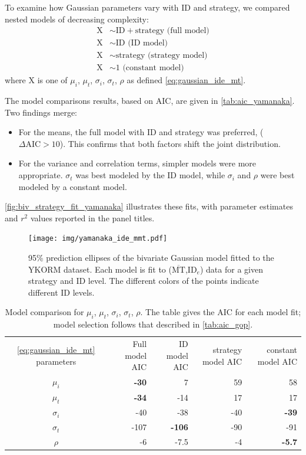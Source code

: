 \documentclass[acmlarge, manuscript,review]{acmart}
\newcommand{\mmt}{\ensuremath{\overline{\mt}}\xspace}
\newcommand{\mt}{\ensuremath{{\text{MT}}}\xspace}
\newcommand{\ide}{\ensuremath{{\text{ID}_e}}\xspace}
\begin{document}
To examine how Gaussian parameters vary with ID and strategy, we compared nested models of decreasing complexity:
\begin{align}
	\text{X} & \sim \text{ID} + \text{strategy (full model)}  \\
	\text{X} &\sim \text{ID (ID model)} \\
	\text{X} &\sim \text{strategy (strategy model)} \\
	\text{X} &\sim 1 \text{ (constant model)} 
\end{align}
where X is one of $\mu_i$, $\mu_t$, $\sigma_i$, $\sigma_t$, $\rho$ as defined \autoref{eq:gaussian_ide_mt}. 


The model comparisons results, based on AIC, are given in \autoref{tab:aic_yamanaka}. Two findings merge:
\begin{itemize}
	\item For the means, the full model with ID and strategy was preferred, ($\Delta\text{AIC} > 10$). This confirms that both factors shift the joint distribution.
	\item For the variance and correlation terms, simpler models were more appropriate. $\sigma_t$ was best modeled by the ID model, while $\sigma_i$ and $\rho$ were best modeled by a constant model.
\end{itemize}

\autoref{fig:biv_strategy_fit_yamanaka} illustrates these fits, with parameter estimates and $r^2$ values reported in the panel titles.


\begin{figure}[htbp]
	\centering
	\texttt{[image: img/yamanaka\_ide\_mmt.pdf]}
	\caption{95\% prediction ellipses of the bivariate Gaussian model fitted to the YKORM dataset. Each model is fit to (\mmt,\ide) data for a given strategy and ID level. The different colors of the points indicate different ID levels.}
	\label{fig:yamanaka_ide_mmt}
\end{figure}

\begin{table}[htbp]
	\centering
	\caption{Model comparison for $\mu_i$, $\mu_t$, $\sigma_i$, $\sigma_t$, $\rho$. The table gives the AIC for each model fit; model selection follows that described in \autoref{tab:aic_gop}.}
	\label{tab:aic_yamanaka}
	\begin{tabular}{c rrrr}
	\autoref{eq:gaussian_ide_mt} parameters	& Full model AIC & ID model AIC& strategy model AIC& constant model AIC\\
	$\mu_i$ & \textbf{-30} & 7 & 59 & 58 \\
	$\mu_t$ & \textbf{-34} & -14  & 17 & 17 \\
	$\sigma_i$ & -40 & -38 & -40 & \textbf{-39} \\
	$\sigma_t$ & -107 & \textbf{-106} & -90 & -91 \\
	$\rho$ & -6 & -7.5& -4& \textbf{-5.7} \\
	\end{tabular}
\end{table}
\end{document}
